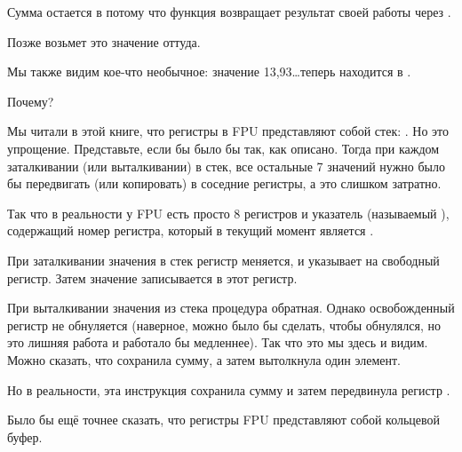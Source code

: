 Сумма остается в  потому что функция возвращает результат своей работы через .

Позже \main возьмет это значение оттуда.

Мы также видим кое-что необычное: значение 13,93\ldots теперь находится в .

Почему?

\label{FPU_is_rather_circular_buffer}
Мы читали в этой книге, что регистры в \ac{FPU} представляют собой стек: . 
Но это упрощение.
Представьте, если бы  было бы так, как описано. Тогда при каждом заталкивании (или выталкивании) в стек,
все остальные 7 значений нужно было бы передвигать (или копировать) в соседние регистры, 
а это слишком затратно.

Так что в реальности у
\ac{FPU} есть просто 8 регистров и указатель (называемый ), содержащий номер регистра,
который в текущий момент является .

При заталкивании значения в стек регистр  меняется, и указывает на свободный регистр. 
Затем значение записывается в этот регистр.

При выталкивании значения из стека процедура обратная. Однако освобожденный регистр не обнуляется
(наверное, можно было бы сделать, чтобы обнулялся, но это лишняя работа и работало бы медленнее).
Так что это мы здесь и видим. 
Можно сказать, что \FADDP сохранила сумму, а затем вытолкнула один элемент.

Но в реальности, эта инструкция сохранила сумму и затем передвинула регистр .

Было бы ещё точнее сказать, что регистры \ac{FPU} представляют собой кольцевой буфер.

